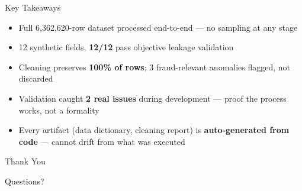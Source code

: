 \documentclass[aspectratio=169]{beamer}
\begin{document}
\begin{frame}{Key Takeaways}
\begin{itemize}
    \item Full 6,362,620-row dataset processed end-to-end --- no sampling at any stage
    \item 12 synthetic fields, \textbf{12/12} pass objective leakage validation
    \item Cleaning preserves \textbf{100\% of rows}; 3 fraud-relevant anomalies flagged, not discarded
    \item Validation caught \textbf{2 real issues} during development --- proof the process works, not a formality
    \item Every artifact (data dictionary, cleaning report) is \textbf{auto-generated from code} --- cannot drift from what was executed
\end{itemize}
\end{frame}

\begin{frame}
\centering
\Huge Thank You
\vspace{0.5cm}

\Large Questions?
\end{frame}
\end{document}

